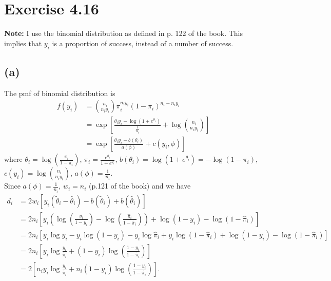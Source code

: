\section*{Exercise 4.16}
\textbf{Note:} I use the binomial distribution as defined in p. 122 of the book. This implies that $y_{i}$ is a proportion of success, instead of a number of success.

\subsection*{(a)}
The pmf of binomial distribution is
\begin{align*}
f(y_{i}) &= \binom{n_{i}}{n_{i}y_{i}} \pi_{i}^{n_{i}y_{i}} (1-\pi_{i})^{n_{i}-n_{i}y_{i}}\\
&= \exp\left[\frac{\theta_{i}y_{i} -\log\left(1+e^{\theta_{i}}\right)}{\frac{1}{n_{i}}} + \log\binom{n_{i}}{n_{i}y_{i}}\right]\\
&= \exp\left[\frac{\theta_{i}y_{i} -b(\theta_{i})}{a(\phi)} + c(y_{i},\phi)\right]
\end{align*}
where $\theta_{i} = \log\left(\frac{\pi_{i}}{1-\pi_{i}}\right)$, $\pi_{i} = \frac{e^{\theta_{i}}}{1+e^{\theta_{i}}}$, $b(\theta_{i}) = \log\left(1+e^{\theta_{i}}\right) = -\log\left(1-\pi_{i}\right)$, $c(y_{i}) = \log\binom{n_{i}}{n_{i}y_{i}}$, $a(\phi) = \frac{1}{n_{i}}$.\\
Since $a(\phi) = \frac{1}{n_{i}}$, $w_{i} = n_{i}$ (p.121 of the book) and we have
\begin{align*}
d_{i} &= 2w_{i}\left[y_{i}\left(\widetilde{\theta}_{i} - \widehat{\theta}_{i}\right) -b\left(\widetilde{\theta}_{i}\right) + b\left(\widehat{\theta}_{i}\right)\right]\\
&= 2n_{i}\left[y_{i}\left(\log\left(\frac{y_{i}}{1-y_{i}}\right) -  \log\left(\frac{\widehat{\pi}_{i}}{1-\widehat{\pi}_{i}}\right)\right) +\log\left(1-y_{i}\right) -\log\left(1-\widehat{\pi}_{i}\right)\right]\\
&= 2n_{i}\left[y_{i}\log y_{i} - y_{i}\log (1-y_{i}) - y_{i}\log\widehat{\pi}_{i} +y_{i}\log(1-\widehat{\pi}_{i}) +\log\left(1-y_{i}\right) -\log\left(1-\widehat{\pi}_{i}\right)\right]\\
&= 2n_{i}\left[y_{i}\log \frac{y_{i}}{\widehat{\pi}_{i}} +(1-y_{i})\log\left(\frac{1-y_{i}}{1-\widehat{\pi}_{i}}\right)\right]\\
&= 2\left[n_{i}y_{i}\log \frac{y_{i}}{\widehat{\pi}_{i}} +n_{i}(1-y_{i})\log\left(\frac{1-y_{i}}{1-\widehat{\pi}_{i}}\right)\right].
\end{align*}

